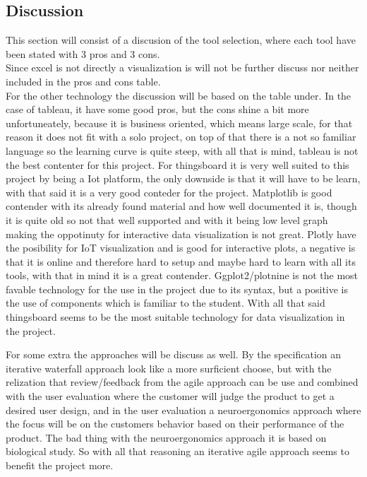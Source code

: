 \documentclass{article}
\begin{document}
\subsection{Discussion}
	This section will consist of a discusion of the tool selection, where each tool have been stated with 3 pros and 3 cons.
	\\Since excel is not directly a visualization is will not be further discuss nor neither included in the pros and cons table.
	\\For  the other technology the discussion will be based on the table under. In the case of tableau, it have some good pros, but the cons shine a bit more unfortuneately, because it is business oriented, which means large scale, for that reason it does not fit with a solo project, on top of that there is a not so familiar language so the learning curve is quite steep, with all that is mind, tableau is not the best contenter for this project. For thingsboard it is very well suited to this project by being a Iot platform, the only downside is that it will have to be learn, with that said it is a very good conteder for the project. Matplotlib is good contender with its already found material and how well documented it is, though it is quite old so not that well supported and with it being low level graph making the  oppotinuty for interactive data visualization is not great. Plotly have the posibility for IoT visualization and is good for interactive plots, a negative is that it is online and therefore hard to setup and maybe hard to learn with all its tools, with that in mind it is a great contender. Ggplot2/plotnine is not the most favable technology for the use in the project due to its syntax, but a positive is the use of components which is familiar to the student.
    With all that said thingsboard seems to be the most suitable technology for data visualization in the project.
	
    For some extra the approaches will be discuss as well. By the specification an iterative waterfall approach look like a more surficient choose, but with the relization that review/feedback from the agile approach can be use and combined with the user evaluation where the customer will judge the product to get a desired user design, and in the user evaluation a neuroergonomics approach where the focus will be on the customers behavior based on their performance of the product. The bad thing with the neuroergonomics approach it is based on biological study. So with all that reasoning an iterative agile approach seems to benefit the project more.
    
\end{document}
